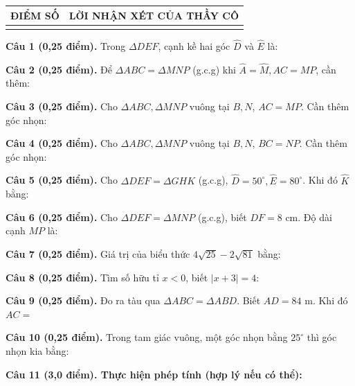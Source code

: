 \documentclass[12pt,a4paper]{article}
\begin{document}
\vspace{1.0mm}

\noindent
\begin{tabularx}{\linewidth}{|p{3.2cm}|X|}
\hline
\centering\textbf{ĐIỂM SỐ} & \centering\textbf{LỜI NHẬN XÉT CỦA THẦY CÔ} \tabularnewline
\hline
\rule{0pt}{1.8cm} & \tabularnewline
\hline
\end{tabularx}

\vspace{1.2mm}
\noindent\textbf{Câu 1 (0,25 điểm).} Trong $\Delta DEF$, cạnh kề hai góc $\widehat{D}$ và $\widehat{E}$ là: \par\vspace{3.0mm}
\noindent\textbf{Câu 2 (0,25 điểm).} Để $\Delta ABC = \Delta MNP$ (g.c.g) khi $\widehat{A}=\widehat{M}, AC=MP$, cần thêm: \par\vspace{3.0mm}
\noindent\textbf{Câu 3 (0,25 điểm).} Cho $\Delta ABC, \Delta MNP$ vuông tại $B, N$, $AC=MP$. Cần thêm góc nhọn: \par\vspace{3.0mm}
\noindent\textbf{Câu 4 (0,25 điểm).} Cho $\Delta ABC, \Delta MNP$ vuông tại $B, N$, $BC=NP$. Cần thêm góc nhọn: \par\vspace{3.0mm}
\noindent\textbf{Câu 5 (0,25 điểm).} Cho $\Delta DEF = \Delta GHK$ (g.c.g), $\widehat{D}=50^\circ, \widehat{E}=80^\circ$. Khi đó $\widehat{K}$ bằng: \par\vspace{3.0mm}
\noindent\textbf{Câu 6 (0,25 điểm).} Cho $\Delta DEF = \Delta MNP$ (g.c.g), biết $DF = 8\text{ cm}$. Độ dài cạnh $MP$ là: \par\vspace{3.0mm}
\noindent\textbf{Câu 7 (0,25 điểm).} Giá trị của biểu thức $4\sqrt{25} - 2\sqrt{81}$ bằng: \par\vspace{3.0mm}
\noindent\textbf{Câu 8 (0,25 điểm).} Tìm số hữu tỉ $x < 0$, biết $|x + 3| = 4$: \par\vspace{3.0mm}
\noindent\textbf{Câu 9 (0,25 điểm).} Đo ra tàu qua $\Delta ABC = \Delta ABD$. Biết $AD = 84\text{ m}$. Khi đó $AC = $ \par\vspace{3.0mm}
\noindent\textbf{Câu 10 (0,25 điểm).} Trong tam giác vuông, một góc nhọn bằng $25^\circ$ thì góc nhọn kia bằng: \par\vspace{3.0mm}
\vspace{0.2mm}
\noindent\textbf{Câu 11 (3,0 điểm). Thực hiện phép tính (hợp lý nếu có thể):}
\vspace{0.6mm}
\end{document}

